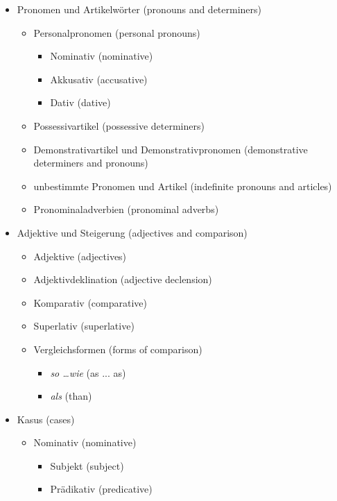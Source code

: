 \documentclass[a4paper]{article}
\begin{document}
\begin{itemize}
            \item Pronomen und Artikelwörter {\small (pronouns and determiners)}
            \begin{itemize}
                \item Personalpronomen {\small (personal pronouns)}
                \begin{itemize}
                    \item Nominativ {\small (nominative)}
                    \item Akkusativ {\small (accusative)}
                    \item Dativ {\small (dative)}
                \end{itemize}
                
                \item Possessivartikel {\small (possessive determiners)}
                \item Demonstrativartikel und Demonstrativpronomen {\small (demonstrative determiners and pronouns)}
                \item unbestimmte Pronomen und Artikel {\small (indefinite pronouns and articles)}
                \item Pronominaladverbien {\small (pronominal adverbs)}
            \end{itemize}
            
            \item Adjektive und Steigerung {\small (adjectives and comparison)}
            \begin{itemize}
                \item Adjektive {\small (adjectives)}
                \item Adjektivdeklination {\small (adjective declension)}
                \item Komparativ {\small (comparative)}
                \item Superlativ {\small (superlative)}
                \item Vergleichsformen {\small (forms of comparison)}
                \begin{itemize}
                    \item \textit{so \dots wie} {\small (as ... as)}
                    \item \textit{als} {\small (than)}
                \end{itemize}
            \end{itemize}
            
            \item Kasus {\small (cases)}
            \begin{itemize}
                \item Nominativ {\small (nominative)}
                \begin{itemize}
                    \item Subjekt {\small (subject)}
                    \item Prädikativ {\small (predicative)}
                \end{itemize}
                

\end{itemize}
\end{itemize}
\end{document}
